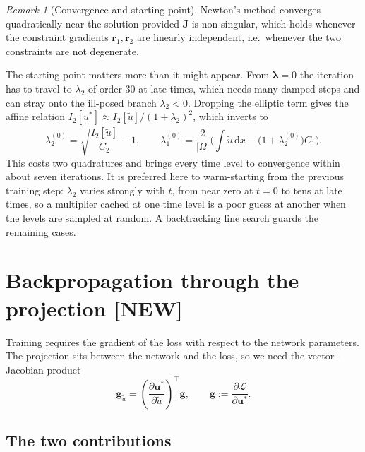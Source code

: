 \documentclass[11pt,a4paper]{article}
\theoremstyle{remark}
\newtheorem{remark}{Remark}
\newcommand{\dx}{\,\mathrm{d}x}
\newcommand{\ut}{\tilde{u}}
\newcommand{\us}{u^{*}}
\newcommand{\Om}{\Omega}
\begin{document}
\begin{remark}[Convergence and starting point]
Newton's method converges quadratically near the solution provided $\bm{J}$ is
non-singular, which holds whenever the constraint gradients $\bm{r}_1,\bm{r}_2$
are linearly independent, i.e.\ whenever the two constraints are not degenerate.

The starting point matters more than it might appear. From $\bm\lambda = 0$ the
iteration has to travel to $\lambda_2$ of order $30$ at late times, which needs
many damped steps and can stray onto the ill-posed branch $\lambda_2 < 0$.
Dropping the elliptic term gives the affine relation
$I_2[\us]\approx I_2[\ut]/(1+\lambda_2)^2$, which inverts to
\begin{equation}
\lambda_2^{(0)} = \sqrt{\frac{I_2[\ut]}{C_2}} - 1,
\qquad
\lambda_1^{(0)} = \frac{2}{|\Om|}\Big(\textstyle\int\ut\dx
- \big(1+\lambda_2^{(0)}\big)C_1\Big).
\end{equation}
This costs two quadratures and brings every time level to convergence within
about seven iterations. It is preferred here to warm-starting from the previous
training step: $\lambda_2$ varies strongly with $t$, from near zero at $t=0$ to
tens at late times, so a multiplier cached at one time level is a poor guess at
another when the levels are sampled at random. A backtracking line search
guards the remaining cases.
\end{remark}

\section{Backpropagation through the projection \textbf{[NEW]}}
\label{sec:backward}

Training requires the gradient of the loss with respect to the network
parameters. The projection sits between the network and the loss, so we need the
vector--Jacobian product
\begin{equation}
\bm{g}_{\ut} = \left(\frac{\partial\bm{\us}}{\partial\ut}\right)^{\!\top}\bm{g},
\qquad
\bm{g} := \frac{\partial\mathcal{L}}{\partial\bm{\us}} .
\end{equation}

\subsection{The two contributions}
\end{document}
